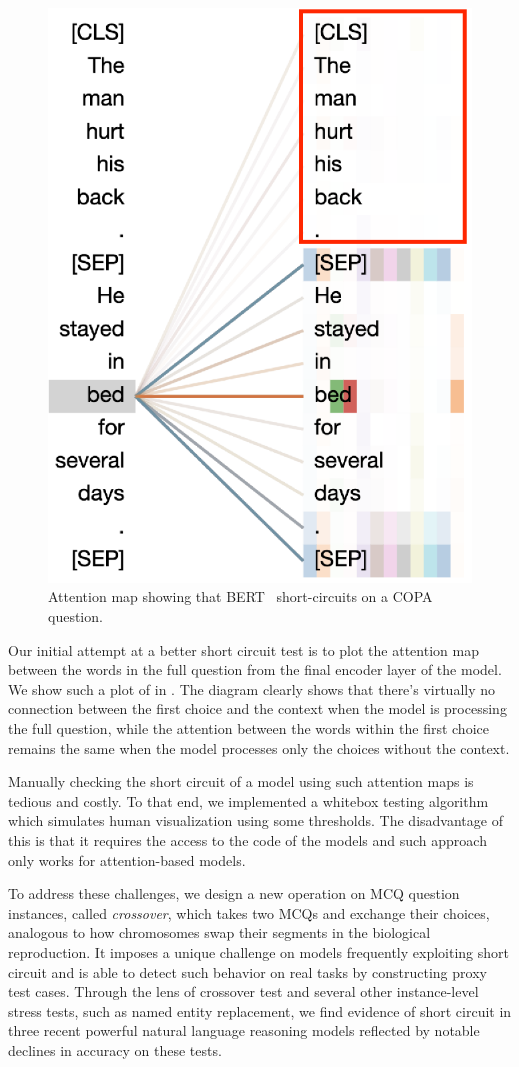 \begin{figure}[th!]
\centering
\includegraphics[width=0.6\columnwidth]{figure/end_related.eps}
\caption{Attention map showing that BERT~\cite{devlin2018bert} 
short-circuits on a COPA question.}
\label{fig:att-goodex}
\end{figure}


Our initial attempt at a better short circuit test
is to plot the attention map between the words in the full question 
from the final encoder layer of the model. We show
such a plot of  in .
The diagram clearly shows that there's virtually no connection
between the first choice and the context when the model is processing
the full question, while the attention between the words within the
first choice remains the same when the model processes only the choices
without the context.

Manually checking the short circuit of a model using such attention maps
is tedious and costly. To that end, we implemented a whitebox testing
algorithm which simulates human visualization using some thresholds. 
The disadvantage of this is that it requires the access to the code of 
the models and such approach only works for attention-based models.

To address these challenges, we design a new operation on 
MCQ question instances, called \textit{crossover},
which takes two MCQs and exchange their
choices, analogous to how chromosomes swap their segments in
the biological reproduction. It imposes a unique challenge on models  frequently exploiting short circuit and is able to detect such behavior 
on real tasks by constructing proxy test cases. 
Through the lens of crossover test and  
several other instance-level stress tests, such as named entity replacement, 
we find evidence of short circuit in three recent powerful natural language
reasoning models reflected by notable declines in accuracy on these tests.

